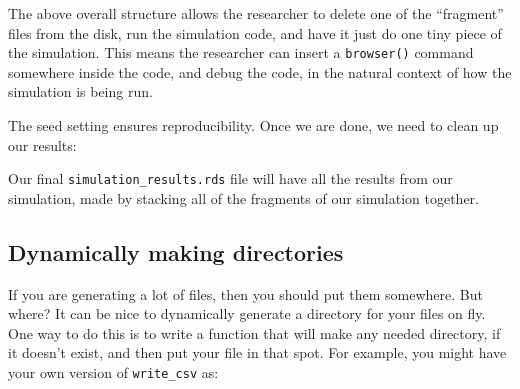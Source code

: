 \documentclass[
]{book}
\newenvironment{Shaded}{\begin{snugshade}}{\end{snugshade}}
\newcommand{\AttributeTok}[1]{\textcolor[rgb]{0.13,0.29,0.53}{#1}}
\newcommand{\CommentTok}[1]{\textcolor[rgb]{0.56,0.35,0.01}{\textit{#1}}}
\newcommand{\DecValTok}[1]{\textcolor[rgb]{0.00,0.00,0.81}{#1}}
\newcommand{\FunctionTok}[1]{\textcolor[rgb]{0.13,0.29,0.53}{\textbf{#1}}}
\newcommand{\NormalTok}[1]{#1}
\newcommand{\OtherTok}[1]{\textcolor[rgb]{0.56,0.35,0.01}{#1}}
\newcommand{\SpecialCharTok}[1]{\textcolor[rgb]{0.81,0.36,0.00}{\textbf{#1}}}
\newcommand{\StringTok}[1]{\textcolor[rgb]{0.31,0.60,0.02}{#1}}
\begin{document}
The above overall structure allows the researcher to delete one of the ``fragment'' files from the disk, run the simulation code, and have it just do one tiny piece of the simulation.
This means the researcher can insert a \texttt{browser()} command somewhere inside the code, and debug the code, in the natural context of how the simulation is being run.

The seed setting ensures reproducibility.
Once we are done, we need to clean up our results:

\begin{Shaded}
\end{Shaded}

Our final \texttt{simulation\_results.rds} file will have all the results from our simulation, made by stacking all of the fragments of our simulation together.

\subsection{Dynamically making directories}\label{dynamically-making-directories}

If you are generating a lot of files, then you should put them somewhere.
But where?
It can be nice to dynamically generate a directory for your files on fly.
One way to do this is to write a function that will make any needed directory, if it doesn't exist, and then put your file in that spot.
For example, you might have your own version of \texttt{write\_csv} as:
\end{document}
